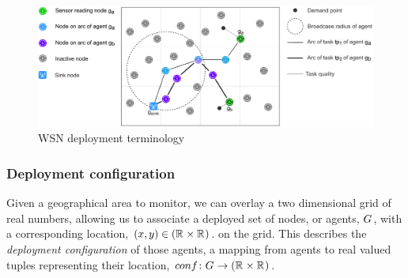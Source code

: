 \newcommand{\varLocation}[2]{\varSymbol{loc}{#1}{#2}}
\newcommand{\setLocation}[2]{\setSymbol{LOC}{#1}{#2}}
\newcommand{\formalVarLocation}[2]{(x,y)}
\newcommand{\formalSetLocation}[2]{(\setRealNumbers{}{} \times \setRealNumbers{}{})}

\newcommand{\functionDeployment}[2]{
\ifx \\1\\
\functionSignature{conf}{\setAgents{}{}}
\else
\functionSignature{conf}{#1}
\fi 
}
\newcommand{\formalDeployment}[2]{\functionFormal{conf}{\setAgents{}{}}{(\setRealNumbers{}{} \times \setRealNumbers{}{})}}
\newcommand{\functionTaskArc}[2]{\functionSignature{arc}{\varAtomicTask{}{}}}
\newcommand{\formalTaskArc}[2]{\functionFormal{arc}{\setAtomicTask{}{}}{\powerSetAgents{}{}}}
\newcommand{\functionTaskDemandPoint}[2]{\functionSignature{dp}{\varAtomicTask{}{}}}
\newcommand{\formalTaskDemandPoint}[2]{\functionFormal{dp}{\setAtomicTask{}{}}{(\setRealNumbersNonNegative{}{} \times \setRealNumbersNonNegative)}}
\newcommand{\varActiveAgent}[2]{\varAgent{#1}{\oplus}}
\newcommand{\varInactiveAgent}[2]{\varAgent{#1}{\ominus}}
\newcommand{\varSensingAgent}[2]{\varAgent{#1}{\ast}}
\newcommand{\varSinkAgent}[2]{\varAgent{#1}{\Delta}}

\newcommand{\varEnergy}[2]{\varSymbol{e}{#1}{#2}}
\newcommand{\setEnergy}[2]{\setSymbol{E}{#1}{#2}}



\begin{figure}
\centering 
\includegraphics[width=0.9\linewidth]{grid_concept}
\caption[WSN deployment terminology]{WSN deployment terminology}
\label{fig:gridconcept}
\end{figure}

\subsubsection*{Deployment configuration}
Given a geographical area to monitor, we can overlay a two dimensional grid of real numbers, allowing us to associate a deployed set of nodes, or agents, $G_{}^{}$, with a corresponding location, $\formalVarLocation{}{} \in \formalSetLocation{}{}$. on the grid. This describes the \textit{deployment configuration} of those agents, a mapping from agents to real valued tuples representing their location,  $\formalDeployment{}{}$.


